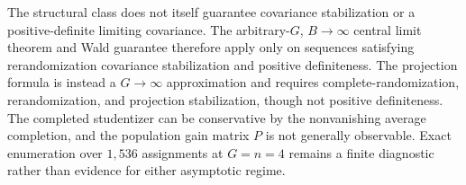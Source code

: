 The structural class does not itself guarantee covariance stabilization or a positive-definite limiting covariance.  The arbitrary-\(G\), \(B\to\infty\) central limit theorem and Wald guarantee therefore apply only on sequences satisfying rerandomization covariance stabilization and positive definiteness.  The projection formula is instead a \(G\to\infty\) approximation and requires complete-randomization, rerandomization, and projection stabilization, though not positive definiteness.  The completed studentizer can be conservative by the nonvanishing average completion, and the population gain matrix \(P\) is not generally observable.  Exact enumeration over \(1{,}536\) assignments at \(G=n=4\) remains a finite diagnostic rather than evidence for either asymptotic regime.